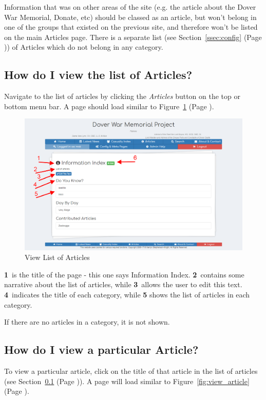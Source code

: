 \documentclass[12pt]{article}
\newcommand{\marker}[1]{\color{red}\textbf{#1}\color{black}}
\newcommand{\myref}[1]{\ref{#1} {\scriptsize(Page \pageref{#1})}}
\begin{document}
Information that was on other areas of the site (e.g. the article about the Dover War Memorial, Donate, etc) should be classed as an article, but won't belong in one of the groups that existed on the previous site, and therefore won't be listed on the main Articles page. There is a separate list (see Section~\myref{ssec:config}) of Articles which do not belong in any category.

\subsection{How do I view the list of Articles?}\label{ssec:view_articles}
Navigate to the list of articles by clicking the \textit{Articles} button on the top or bottom menu bar. A page should load similar to Figure~\myref{fig:view_articles}.

\begin{figure}[h]
  \centering
 \includegraphics[width=.9\textwidth]{pics/view_articles.png}
	\caption{View List of Articles}\label{fig:view_articles}
\end{figure}

\marker{1}\ is the title of the page - this one says Information Index. \marker{2}\ contains some narrative about the list of articles, while \marker{3}\ allows the user to edit this text. \marker{4}\ indicates the title of each category, while \marker{5} shows the list of articles in each category.

\begin{infoBox}
If there are no articles in a category, it is not shown.
\end{infoBox}

\newpage
\FloatBarrier
\subsection{How do I view a particular Article?}\label{ssec:view_article}
To view a particular article, click on the title of that article in the list of articles (see Section~\myref{ssec:view_articles}). A page will load similar to Figure~\myref{fig:view_article}.
\end{document}
